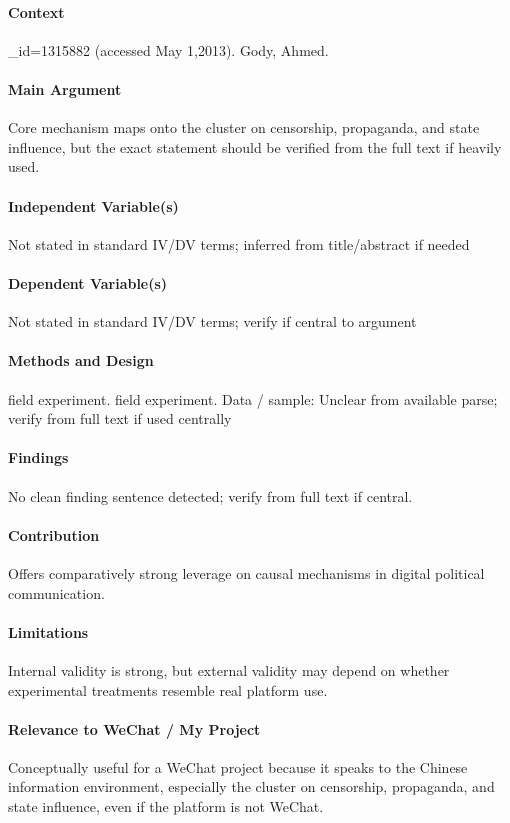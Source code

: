 \documentclass[12pt]{article}
\begin{document}
\paragraph{Context} \_id=1315882 (accessed May 1,2013). Gody, Ahmed.

\paragraph{Main Argument} Core mechanism maps onto the cluster on censorship, propaganda, and state influence, but the exact statement should be verified from the full text if heavily used.

\paragraph{Independent Variable(s)} Not stated in standard IV/DV terms; inferred from title/abstract if needed

\paragraph{Dependent Variable(s)} Not stated in standard IV/DV terms; verify if central to argument

\paragraph{Methods and Design} field experiment. field experiment. Data / sample: Unclear from available parse; verify from full text if used centrally

\paragraph{Findings} No clean finding sentence detected; verify from full text if central.

\paragraph{Contribution} Offers comparatively strong leverage on causal mechanisms in digital political communication.

\paragraph{Limitations} Internal validity is strong, but external validity may depend on whether experimental treatments resemble real platform use.

\paragraph{Relevance to WeChat / My Project} Conceptually useful for a WeChat project because it speaks to the Chinese information environment, especially the cluster on censorship, propaganda, and state influence, even if the platform is not WeChat.
\end{document}
